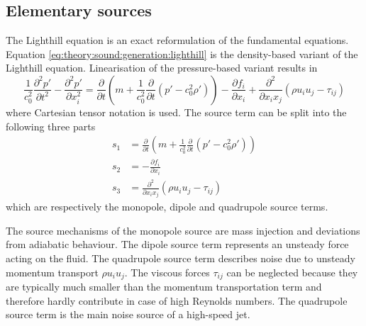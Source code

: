 




\subsection{Elementary sources}
The Lighthill equation is an exact reformulation of the fundamental equations.
Equation \eqref{eq:theory:sound:generation:lighthill} is the density-based
variant of the Lighthill equation. Linearisation of the pressure-based variant
results in
\begin{equation}
 \frac{1}{c_0^2}\frac{\partial^2 p'}{\partial t^2} - \frac{\partial^2 p'}{\partial x_i^2} = \frac{\partial}{\partial t} \left( m + \frac{1}{c_0^2}\frac{\partial}{\partial t}\left(p' - c_0^2 \rho' \right) \right) - \frac{\partial f_i}{\partial x_i} + \frac{\partial^2 }{\partial x_i x_j} \left( \rho u_i u_j - \tau_{ij} \right)
\end{equation}
where Cartesian tensor notation is used.
The source term can be split into the following three parts
\begin{align}
  s_1 &= \frac{\partial}{\partial t} \left( m + \frac{1}{c_0^2}\frac{\partial}{\partial t}\left(p' - c_0^2 \rho' \right) \right) \\
  s_2 &= - \frac{\partial f_i}{\partial x_i} \\
  s_3 &= \frac{\partial^2 }{\partial x_i x_j} \left( \rho u_i u_j - \tau_{ij} \right)
\end{align}
which are respectively the monopole, dipole and quadrupole source terms.


The source mechanisms of the monopole source are mass injection and deviations
from adiabatic behaviour. The dipole source term represents an unsteady force
acting on the fluid. The quadrupole source term describes noise due to unsteady
momentum transport $\rho u_i u_j$. The viscous forces $\tau_{ij}$ can be
neglected because they are typically much smaller than the momentum
transportation term and therefore hardly contribute in case of high Reynolds
numbers. The quadrupole source term is the main noise source of a high-speed jet.


